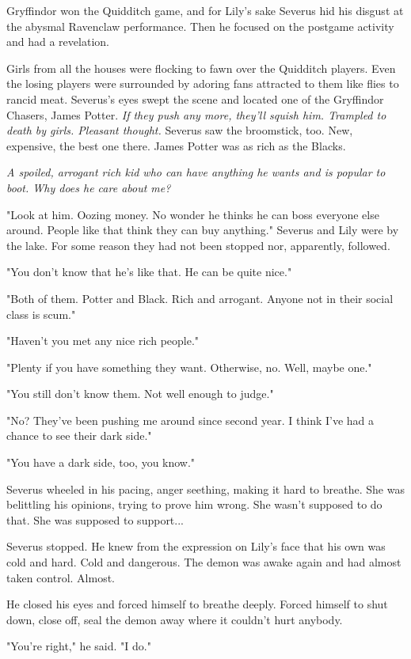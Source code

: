 Gryffindor won the Quidditch game, and for Lily's sake Severus hid his disgust at the abysmal Ravenclaw performance. Then he focused on the postgame activity and had a revelation.

Girls from all the houses were flocking to fawn over the Quidditch players. Even the losing players were surrounded by adoring fans attracted to them like flies to rancid meat. Severus's eyes swept the scene and located one of the Gryffindor Chasers, James Potter. \emph{If they push any more, they'll squish him. Trampled to death by girls. Pleasant thought.} Severus saw the broomstick, too. New, expensive, the best one there. James Potter was as rich as the Blacks.

\emph{A spoiled, arrogant rich kid who can have anything he wants and is popular to boot. Why does he care about me?}

"Look at him. Oozing money. No wonder he thinks he can boss everyone else around. People like that think they can buy anything." Severus and Lily were by the lake. For some reason they had not been stopped nor, apparently, followed.

"You don't know that he's like that. He can be quite nice."

"Both of them. Potter and Black. Rich and arrogant. Anyone not in their social class is scum."

"Haven't you met any nice rich people."

"Plenty if you have something they want. Otherwise, no. Well, maybe one."

"You still don't know them. Not well enough to judge."

"No? They've been pushing me around since second year. I think I've had a chance to see their dark side."

"You have a dark side, too, you know."

Severus wheeled in his pacing, anger seething, making it hard to breathe. She was belittling his opinions, trying to prove him wrong. She wasn't supposed to do that. She was supposed to support...

Severus stopped. He knew from the expression on Lily's face that his own was cold and hard. Cold and dangerous. The demon was awake again and had almost taken control. Almost.

He closed his eyes and forced himself to breathe deeply. Forced himself to shut down, close off, seal the demon away where it couldn't hurt anybody.

"You're right," he said. "I do."

